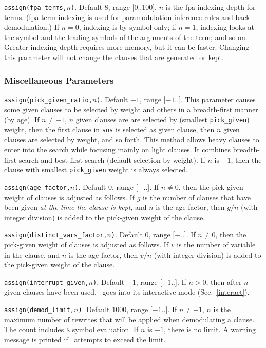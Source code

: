 \documentclass[11pt]{article}
\begin{document}
\noindent
\verb:assign(fpa_terms,:$n$\verb:):.  Default 8, range [0..100].  $n$ is the {\sc fpa}
indexing depth for terms.  ({\sc fpa} term indexing is used for
paramodulation inference rules and back demodulation.)  If $n=0$,
indexing is by symbol only; if $n=1$, indexing looks at the
symbol and the leading symbols of the arguments of the term; and
so on.  Greater indexing depth requires more memory, but it can be
faster.  Changing this parameter will not change the clauses that
are generated or kept.

\subsubsection{Miscellaneous Parameters} \label{misc-parms}

\verb:assign(pick_given_ratio,:$n$\verb:):.  Default $-1$, range [$-1$..\maxint ].
This parameter causes some given clauses to be selected by weight and
others in a breadth-first manner (by age).
If $n \neq -1$, 
$n$ given clauses are are selected by (smallest
\verb:pick_given:) weight,
then the first clause in \verb:sos: is selected as given clause,
then $n$ given clauses are selected by weight, and so forth.
This
method allows heavy clauses to enter into the search while focusing
mainly on light clauses.  It combines breadth-first search
and best-first search (default selection by weight).
If $n$ is $-1$, then the clause with smallest \verb:pick_given: weight is
always selected.

\noindent
\verb:assign(age_factor,:$n$\verb:):.  Default 0, range [$-$\maxint ..\maxint ].
If $n\neq$0, then the pick-given weight of clauses is adjusted as follows.
If $g$ is the number of clauses that have been given
\emph{at the time the clause is kept},
and $n$ is the age factor, then $g / n$
(with integer division) is added to the pick-given weight of the clause.

\noindent
\verb:assign(distinct_vars_factor,:$n$\verb:):.  Default 0, range [$-$\maxint ..\maxint ].
If $n\neq$0, then the pick-given weight of clauses is adjusted as follows.
If $v$ is the number of variable in the clause,
and $n$ is the age factor, then $v / n$
(with integer division) is added to the pick-given weight of the clause.

\noindent
\verb:assign(interrupt_given,:$n$\verb:):.  Default $-1$, range [$-1$..\maxint ].  If $n>0$,
then after $n$ given clauses have been used, \otter\ goes
into its interactive mode (Sec.~\ref{interact}).

\noindent
\verb:assign(demod_limit,:$n$\verb:):.  Default 1000, range [$-1$..\maxint ].  If $n\neq -1$,
$n$ is the maximum number of rewrites that will be
applied when demodulating a clause.  The count includes \verb:$:
symbol evaluation. If $n$ is $-1$, there is no limit.  A warning message
is printed if \otter\ attempts to exceed the limit.
\end{document}
